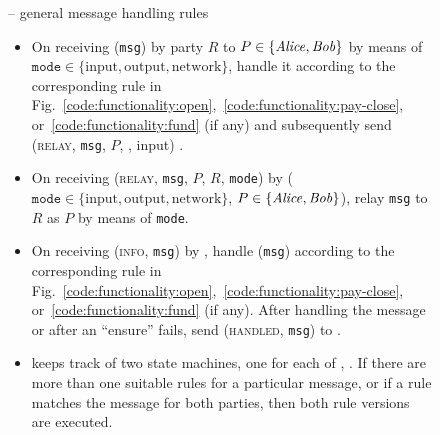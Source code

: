 
\begin{figure}[H]
  \begin{systembox}{\fchan{} -- general message handling rules}
    \begin{itemize}
      \item On receiving (\texttt{msg}) by party $R$ to $P \in \{\mathit{Alice}, \mathit{Bob}\}$
      by means of $\texttt{mode} \in \{\mathrm{input}, \mathrm{output},
      \mathrm{network}\}$, handle it according to the corresponding rule in
      Fig.~\ref{code:functionality:open},~\ref{code:functionality:pay-close},
      or~\ref{code:functionality:fund} (if any) and subsequently send
      (\textsc{relay}, \texttt{msg}, $P$, \environment, input) \adversary.
      \item On receiving (\textsc{relay}, \texttt{msg}, $P$, $R$, \texttt{mode})
      by \adversary ($\texttt{mode} \in \{\mathrm{input}, \mathrm{output},
      \mathrm{network}\}$, $P \in \{\mathit{Alice}, \mathit{Bob}\}$), relay \texttt{msg} to $R$
      as $P$ by means of \texttt{mode}. 
      \item On receiving (\textsc{info}, \texttt{msg}) by \adversary, handle
      (\texttt{msg}) according to the corresponding rule in
      Fig.~\ref{code:functionality:open},~\ref{code:functionality:pay-close},
      or~\ref{code:functionality:fund} (if any). After handling the message or
      after an ``ensure'' fails, send (\textsc{handled}, \texttt{msg}) to
      \adversary. 
      \item \fchan keeps track of two state machines, one for each of \alice,
      \bob. If there are more than one suitable rules for a particular message,
      or if a rule matches the message for both parties, then both rule versions
      are executed. 
    \end{itemize}
  \end{systembox}
  \caption{}
  \label{code:functionality:rules}
\end{figure}


